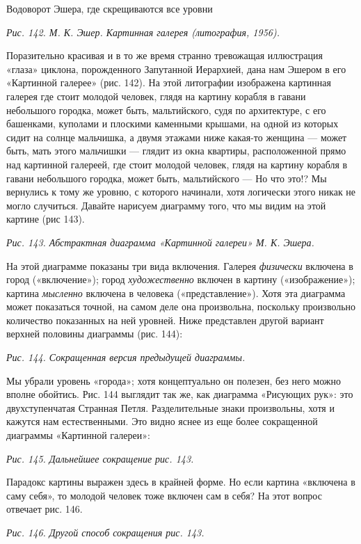 \documentclass[../main.tex]{subfiles}
\begin{document}
Водоворот Эшера, где скрещиваются все уровни

\emph{Рис. 142. М. К. Эшер. Картинная галерея (литография, 1956).}

Поразительно красивая и в то же время странно тревожащая иллюстрация «глаза» циклона, порожденного Запутанной Иерархией, дана нам Эшером в его «Картинной галерее» (рис. 142). На этой литографии изображена картинная галерея где стоит молодой человек, глядя на картину корабля в гавани небольшого городка, может быть, мальтийского, судя по архитектуре, с его башенками, куполами и плоскими каменными крышами, на одной из которых сидит на солнце мальчишка, а двумя этажами ниже какая-то женщина --- может быть, мать этого мальчишки --- глядит из окна квартиры, расположенной прямо над картинной галереей, где стоит молодой человек, глядя на картину корабля в гавани небольшого городка, может быть, мальтийского --- Но что это!? Мы вернулись к тому же уровню, с которого начинали, хотя логически этого никак не могло случиться. Давайте нарисуем диаграмму того, что мы видим на этой картине (рис 143).

\emph{Рис. 143. Абстрактная диаграмма «Картинной галереи» М. К. Эшера.}

На этой диаграмме показаны три вида включения. Галерея \emph{физически} включена в город («включение»); город \emph{художественно} включен в картину («изображение»); картина \emph{мысленно} включена в человека («представление»). Хотя эта диаграмма может показаться точной, на самом деле она произвольна, поскольку произвольно количество показанных на ней уровней. Ниже представлен другой вариант верхней половины диаграммы (рис. 144):

\emph{Рис. 144. Сокращенная версия предыдущей диаграммы.}

Мы убрали уровень «города»; хотя концептуально он полезен, без него можно вполне обойтись. Рис. 144 выглядит так же, как диаграмма «Рисующих рук»: это двухступенчатая Странная Петля. Разделительные знаки произвольны, хотя и кажутся нам естественными. Это видно яснее из еще более сокращенной диаграммы «Картинной галереи»:

\emph{Рис. 145. Дальнейшее сокращение рис. 143.}

Парадокс картины выражен здесь в крайней форме. Но если картина «включена в саму себя», то молодой человек тоже включен сам в себя? На этот вопрос отвечает рис. 146.

\emph{Рис. 146. Другой способ сокращения рис. 143.}
\end{document}
